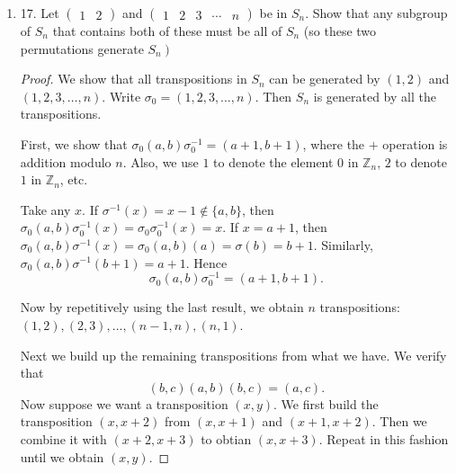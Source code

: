 \begin{enumerate}[resume]
\begin{proof}
\begin{lemma}
\end{lemma}
	\begin{align*}
		&\sigma \tau \sigma^{-1}\\
		&= (\sigma_1 \ldots\sigma_k) \tau \left( \sigma_1\ldots\sigma_k \right) ^{-1} \\
		&= (\sigma_1\sigma_2)\tau(\sigma_1^{-1}\sigma_2^{-1}) (\sigma_3\ldots\sigma_k)\left( \sigma_3\ldots\sigma_k \right) ^{-1} \\
		&= (\sigma_1\sigma_2)\tau(\sigma_1^{-1}\sigma_2^{-1})\\
		&= (\sigma_1\sigma_2)\tau(\sigma_1^{-1}\sigma_2^{-1})\\
		&= \sigma_2(\sigma_1\tau\sigma_1^{-1})\sigma_2^{-1}\\
		&= \sigma_2(\sigma_1\tau\sigma_1^{-1})\sigma_2^{-1}
	.\end{align*}
	Apply the lemma twice and we see it is a transposition.
\end{proof}

\item 17. Let $\left(\begin{array}{ll}1 & 2\end{array}\right)$ and $\left(\begin{array}{lllll}1 & 2 & 3 & \cdots & n\end{array}\right)$ be in $S_n$. Show that any subgroup of $S_n$ that contains both of these must be all of $S_n$ (so these two permutations generate $\left.S_n\right)$
\begin{proof}
	We show that all transpositions in $S_n$ can be generated by $(1,2)$ and $(1,2,3,\ldots,n)$. Write $\sigma_0 = (1,2,3,\ldots,n)$. Then $S_n$ is generated by all the transpositions.

	First, we show that  $\sigma_0 (a,b) \sigma_0^{-1} = (a+1,b+1)$, where the $+$ operation is addition modulo $n$. Also, we use $1$ to denote the element $0$ in $\mathbb{Z}_n$, $2$ to denote $1$ in $\mathbb{Z}_n$, etc.

	Take any $x$. If  $\sigma^{-1} (x) = x-1 \not\in \{a,b\} $, then $\sigma_0(a,b)\sigma_0^{-1}(x) = \sigma_0\sigma_0^{-1}(x) = x$. 
	If $x = a+1$, then $\sigma_0(a,b)\sigma^{-1} (x) =\sigma_{0} (a,b)(a)=\sigma(b) = b+1$. Similarly,  $\sigma_0(a,b)\sigma^{-1}(b+1) = a+1$. Hence
	\[
		\sigma_0(a,b) \sigma_0^{-1} = (a+1,b+1)
	.\] 

	Now by repetitively using the last result, we obtain $n$ transpositions: $(1,2), (2,3),\ldots,(n-1, n), (n, 1)$.

	Next we build up the remaining transpositions from what we have. We verify that 
	\[
		(b,c)(a,b)(b,c) = (a,c)
	.\]
	Now suppose we want a transposition $(x,y)$. We first build the transposition $(x,x+2)$ from $(x,x+1)$ and $(x+1, x+2)$. Then we combine it with  $(x+2, x+3)$ to obtian $(x, x+3)$. Repeat in this fashion until we obtain $(x, y)$.


\end{proof}
\end{enumerate}

